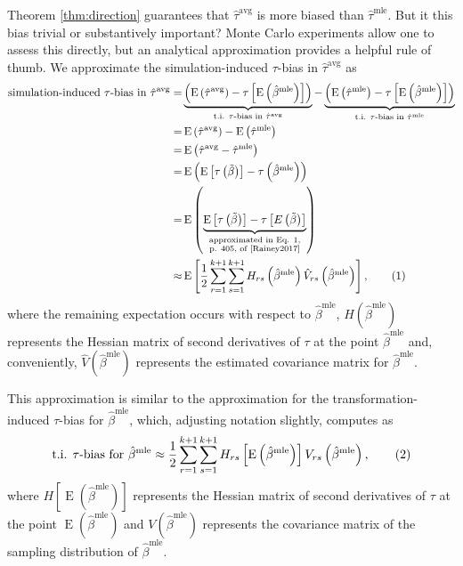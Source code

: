 \documentclass[11pt]{article}
\newcommand\numberthis{\addtocounter{equation}{1}\tag{\theequation}}
\DeclareMathOperator*{\E}{\text{E}}
\begin{document}
Theorem \ref{thm:direction} guarantees that $\hat{\tau}^\text{avg}$ is more biased than $\hat{\tau}^\text{mle}$. But it this bias trivial or substantively important? Monte Carlo experiments allow one to assess this directly, but an analytical approximation provides a helpful rule of thumb.
We approximate the simulation-induced $\tau$-bias in $\hat{\tau}^\text{avg}$ as
\begin{align*}
\text{simulation-induced $\tau$-bias in } \hat{\tau}^\text{avg} =& \underbrace{\left( \E \left( \hat{\tau}^\text{avg}\right) - \tau \left[\E \left( \hat{\beta}^\text{mle} \right) \right] \right) }_{\text{t.i. } \tau\text{-bias in }\hat{\tau}^{\text{avg}}} - \underbrace{ \left( \E \left( \hat{\tau}^\text{mle}\right) -  \tau \left[\E \left( \hat{\beta}^\text{mle} \right) \right] \right)}_{\text{t.i. } \tau\text{-bias in }\hat{\tau}^{\text{mle}}}\\
=& \E \left( \hat{\tau}^\text{avg}\right) - \E \left( \hat{\tau}^\text{mle}\right)\\
=& \E \left( \hat{\tau}^\text{avg} - \hat{\tau}^\text{mle} \right)\\
=& \E \left(     \E \left[ \tau\left( \tilde{\beta} \right) \right]      -      \tau \left( \hat{\beta}^\text{mle} \right)     \right)\\
=& \E \left(     \underbrace{\E \left[ \tau\left( \tilde{\beta} \right) \right]      -      \tau \left[ E\left(  \tilde{\beta} \right)\right]}_{\substack{\text{approximated in Eq. 1,} \\ \text{p. 405, of \cite{Rainey2017}}}}   \right)\\
\approx & \E \left[ \dfrac{1}{2} \displaystyle \sum_{r = 1}^{k+1} \sum_{s = 1}^{k+1} H_{rs}\left( \hat{\beta}^\text{mle} \right) \hat{V}_{rs} \left( \hat{\beta}^{\text{mle}} \right) \right], \numberthis \label{eqn:avg-approx}
\end{align*}
where the remaining expectation occurs with respect to $\hat{\beta}^\text{mle}$, $H\left( \hat{\beta}^\text{mle} \right)$ represents the Hessian matrix of second derivatives of $\tau$ at the point $\hat{\beta}^\text{mle}$ and, conveniently, $\hat{V} \left( \hat{\beta}^{\text{mle}} \right)$ represents the estimated covariance matrix for $\hat{\beta}^\text{mle}$.

This approximation is similar to the approximation for the transformation-induced $\tau$-bias for $\hat{\beta}^\text{mle}$, which, adjusting notation slightly, \citet[p. 405, Eq. 1]{Rainey2017} computes as
\begin{align*}
\text{t.i. } \tau \text{-bias for } \hat{\beta}^\text{mle} \approx \dfrac{1}{2} \displaystyle \sum_{r = 1}^{k+1} \sum_{s = 1}^{k+1} H_{rs}\left[ \E \left( \hat{\beta}^\text{mle} \right) \right] V_{rs} \left( \hat{\beta}^{\text{mle}} \right), \numberthis \label{eqn:mle-approx}
\end{align*}
where $H\left[ \E \left( \hat{\beta}^\text{mle} \right) \right]$ represents the Hessian matrix of second derivatives of $\tau$ at the point $\E \left( \hat{\beta}^\text{mle} \right)$ and $V \left( \hat{\beta}^{\text{mle}} \right)$ represents the covariance matrix of the sampling distribution of $\hat{\beta}^\text{mle}$.
\end{document}
